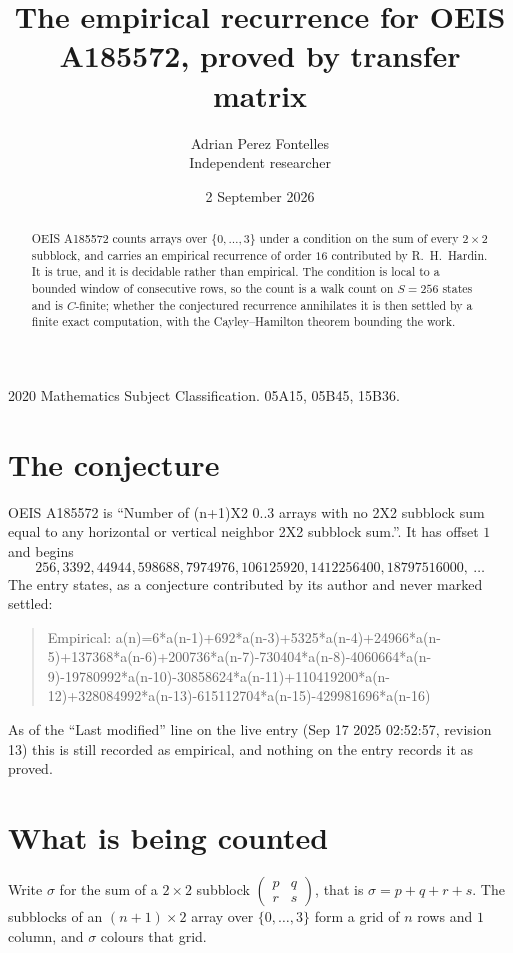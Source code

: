 \documentclass[11pt,a4paper]{article}
\title{The empirical recurrence for OEIS A185572, proved by transfer matrix}
\author{Adrian Perez Fontelles\\ \small Independent researcher}
\date{2 September 2026}
\theoremstyle{plain}
\theoremstyle{definition}
\begin{document}
\maketitle

\begin{abstract}
OEIS A185572 counts arrays over $\{0,\dots,3\}$ under a condition on the sum of every
$2\times2$ subblock, and carries an empirical recurrence of order $16$ contributed by
R.~H.~Hardin. It is true, and it is decidable rather than empirical. The condition is local to
a bounded window of consecutive rows, so the count is a walk count on $S=256$ states and is
$C$-finite; whether the conjectured recurrence annihilates it is then settled by a finite exact
computation, with the Cayley--Hamilton theorem bounding the work.
\end{abstract}

\noindent\small 2020 Mathematics Subject Classification. 05A15, 05B45, 15B36.\normalsize

\section{The conjecture}

OEIS A185572 is ``Number of (n+1)X2 0..3 arrays with no 2X2 subblock sum equal to any horizontal or vertical neighbor 2X2 subblock sum.''. It has offset $1$ and begins
\[
256, 3392, 44944, 598688, 7974976, 106125920, 1412256400, 18797516000,\ \dots
\]
The entry states, as a conjecture contributed by its author and never marked settled:
\begin{quote}
Empirical: a(n)=6*a(n-1)+692*a(n-3)+5325*a(n-4)+24966*a(n-5)+137368*a(n-6)+200736*a(n-7)-730404*a(n-8)-4060664*a(n-9)-19780992*a(n-10)-30858624*a(n-11)+110419200*a(n-12)+328084992*a(n-13)-615112704*a(n-15)-429981696*a(n-16)
\end{quote}
As of the ``Last modified'' line on the live entry (Sep 17 2025 02:52:57, revision 13) this is still
recorded as empirical, and nothing on the entry records it as proved.

\section{What is being counted}

Write $\sigma$ for the sum of a $2\times2$ subblock
$\begin{pmatrix}p&q\\r&s\end{pmatrix}$, that is $\sigma=p+q+r+s$. The subblocks of an
$(n+1)\times2$ array over $\{0,\dots,3\}$ form a grid of $n$ rows and $1$
column, and $\sigma$ colours that grid.
\end{document}
